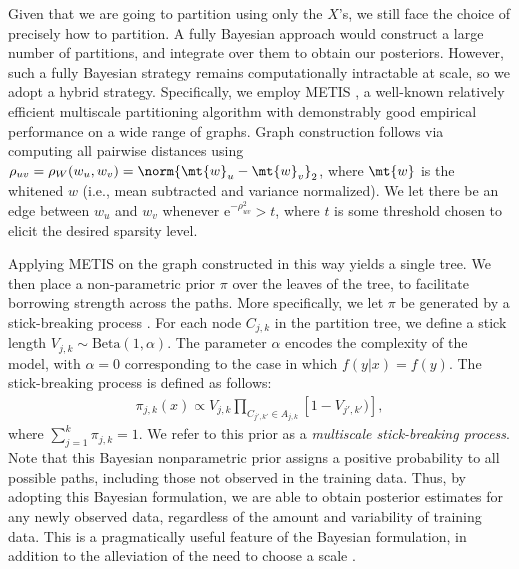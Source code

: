 	Given that we are going to partition using only the $X$'s, we still face the choice of precisely how to partition.  A fully Bayesian approach would construct a large number of partitions, and integrate over them to obtain our posteriors.  However, such a fully Bayesian strategy remains  computationally intractable at scale, so we adopt a hybrid strategy.  Specifically, we employ METIS \cite{METIS}, a well-known relatively efficient multiscale partitioning algorithm with demonstrably good empirical performance on a wide range of graphs.  Graph construction follows via computing all pairwise distances using $\rho_{uv}=\rho_W(w_u,w_v)=\norm{\mt{w}_u-\mt{w}_v}_2$, where $\mt{w}$ is the whitened $w$ (i.e., mean subtracted and variance normalized). We let there be an edge between $w_u$ and $w_v$ whenever  e$^{-\rho_{uv}^2} > t$, where $t$ is some threshold chosen to elicit the desired sparsity level.
	
	Applying METIS on the graph constructed in this way yields a single tree.  We then place a non-parametric prior $\pi$ over the leaves of the tree, to facilitate borrowing strength across the paths.  More specifically, we let $\pi$ be generated by a stick-breaking process \cite{stickbreaking}.  For each node $C_{j,k}$ in the partition tree, we define a stick length $V_{j,k} \sim \mbox{Beta}(1,\alpha)$.  The parameter $\alpha$ encodes the complexity of the model, with $\alpha=0$ corresponding to the case in which $f(y|x) = f(y)$. The stick-breaking process is defined as follows: 
	\begin{eqnarray*}
	\pi_{j,k}(x) \propto V_{j,k} \prod_{C_{j',k'} \in A_{j,k}} \left[1 - V_{j',k'}) \right],
	\end{eqnarray*}
	where  $\sum_{j=1}^k \pi_{j,k} = 1$.   We refer to this prior as a {\em multiscale stick-breaking process}. Note that this Bayesian nonparametric prior assigns a positive probability to all possible paths, including those not observed in the training data.  Thus, by adopting this Bayesian formulation, we are able to obtain posterior estimates for any newly observed data, regardless of the amount and variability of training data.  This is a pragmatically useful feature of the Bayesian formulation, in addition to the alleviation of the need to choose a scale \cite{ChenMaggioni12}.  %


